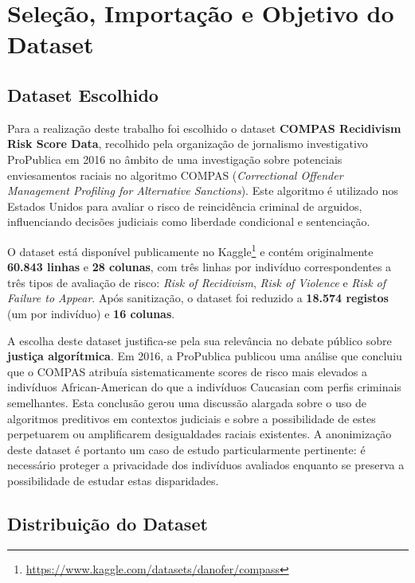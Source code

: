 \section{Seleção, Importação e Objetivo do Dataset}
\label{sec:selecao}

\subsection{Dataset Escolhido}
\label{sec:dataset}

Para a realização deste trabalho foi escolhido o dataset \textbf{COMPAS Recidivism Risk Score Data}, recolhido pela organização de jornalismo investigativo ProPublica em 2016 no âmbito de uma investigação sobre potenciais enviesamentos raciais no algoritmo COMPAS (\textit{Correctional Offender Management Profiling for Alternative Sanctions}). Este algoritmo é utilizado nos Estados Unidos para avaliar o risco de reincidência criminal de arguidos, influenciando decisões judiciais como liberdade condicional e sentenciação.

O dataset está disponível publicamente no Kaggle\footnote{\url{https://www.kaggle.com/datasets/danofer/compass}} e contém originalmente \textbf{60.843 linhas} e \textbf{28 colunas}, com três linhas por indivíduo correspondentes a três tipos de avaliação de risco: \textit{Risk of Recidivism}, \textit{Risk of Violence} e \textit{Risk of Failure to Appear}. Após sanitização, o dataset foi reduzido a \textbf{18.574 registos} (um por indivíduo) e \textbf{16 colunas}.

A escolha deste dataset justifica-se pela sua relevância no debate público sobre \textbf{justiça algorítmica}. Em 2016, a ProPublica publicou uma análise que concluiu que o COMPAS atribuía sistematicamente scores de risco mais elevados a indivíduos African-American do que a indivíduos Caucasian com perfis criminais semelhantes. Esta conclusão gerou uma discussão alargada sobre o uso de algoritmos preditivos em contextos judiciais e sobre a possibilidade de estes perpetuarem ou amplificarem desigualdades raciais existentes. A anonimização deste dataset é portanto um caso de estudo particularmente pertinente: é necessário proteger a privacidade dos indivíduos avaliados enquanto se preserva a possibilidade de estudar estas disparidades.

\subsection{Distribuição do Dataset}
\label{sec:distribuicao}

